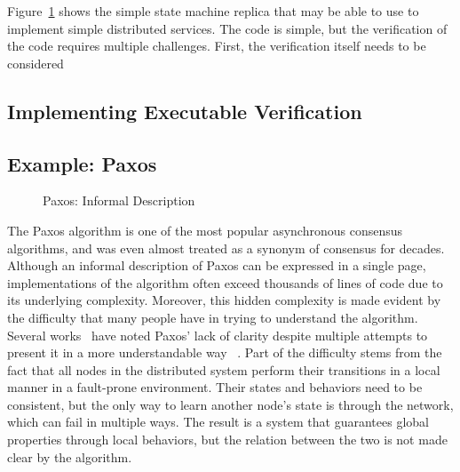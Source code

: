 
Figure~\ref{fig:paxos-pseudocode} shows the simple state machine replica that may be able to use to implement 
simple distributed services. 
The code is simple, but the verification of the code requires multiple challenges.
First, the verification itself needs to be considered 


\subsection{Implementing Executable Verification}


\subsection{}



\subsection{Example: Paxos} 
\label{subsec:paxos} 

\begin{figure}
\begin{minipage}{\linewidth}
\noindent
\begin{multicols}{2}

\end{multicols}
\end{minipage}
\caption{Paxos: Informal Description}
\label{fig:paxos-pseudocode}
\end{figure}

The Paxos algorithm is one of the most popular asynchronous consensus algorithms, and was even almost treated as a synonym of
consensus for decades.
Although an informal description of Paxos can be expressed in a single page,
implementations of the algorithm often exceed thousands of lines of code due to its underlying complexity.
Moreover, this hidden complexity is made evident by the difficulty that many people have in trying to understand the algorithm.
Several works~\cite{raft, rvrpaxos} have noted Paxos' lack of clarity despite multiple attempts to present
it in a more understandable way ~\cite{paxosmadesimple, Lampson1996, Lampson2001, dpaxos}.
Part of the difficulty stems from the fact that all nodes in the distributed system perform their transitions in a local manner in a fault-prone environment.
Their states and behaviors need to be consistent, but
the only way to learn another node's state is through the network, which can fail in multiple ways.
The result is a system that guarantees global properties through local behaviors, but the relation between the two is not made clear by the algorithm.

